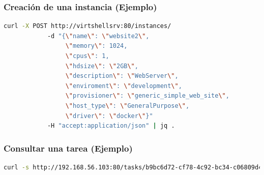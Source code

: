 \documentclass[xcolor=dvipsnames,table]{beamer} %
\begin{document}

\begin{frame}[fragile]
	\frametitle{Creación de una instancia (Ejemplo)}
	\begin{lstlisting}[language=Bash,basicstyle=\ttfamily\scriptsize,keywordstyle=\color{blue}]
		curl -X POST http://virtshellsrv:80/instances/ 
		    -d "{\"name\": \"website2\", 
		         \"memory\": 1024, 
		         \"cpus\": 1, 
		         \"hdsize\": \"2GB\", 
		         \"description\": \"WebServer\", 
		         \"enviroment\": \"development\", 
		         \"provisioner\": \"generic_simple_web_site\", 
		         \"host_type\": \"GeneralPurpose\", 
		         \"driver\": \"docker\"}" 
		    -H "accept:application/json" | jq .
	\end{lstlisting}
\end{frame}



\begin{frame}[fragile]
	\frametitle{Consultar una tarea (Ejemplo)}
	\begin{lstlisting}[language=Bash,basicstyle=\ttfamily\scriptsize,keywordstyle=\color{blue}]
		curl -s http://192.168.56.103:80/tasks/b9bc6d72-cf78-4c92-bc34-c06809d4d52b | jq .
	\end{lstlisting}
\end{frame}



\end{document}
